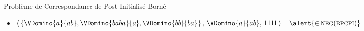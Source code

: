 \begin{frame}{Problème de Correspondance de Post Initialisé Borné}
     {
    \begin{itemize}
    \item $\left\langle\, \left\{
      \VDomino{a}{ab}, 
      \VDomino{baba}{a}, 
      \VDomino{bb}{ba}
      \right\},\,
      \VDomino{a}{ab},\, 1111 \,\right\rangle
      \quad\alert{\in\textsc{neg}(\textsc{bpcpi})}
      $
    \end{itemize}
  }

\end{frame}

\endgroup
